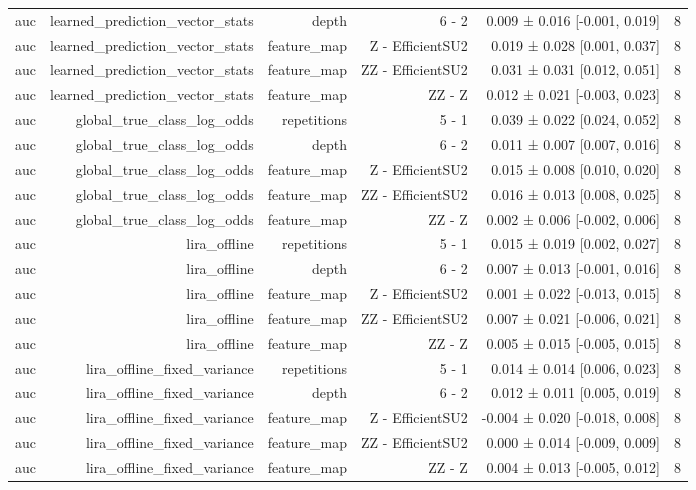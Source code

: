\begin{table}
\begin{tabular}{lrrrrr}
auc & learned\_prediction\_vector\_stats & depth & 6 - 2 & 0.009 ± 0.016 [-0.001, 0.019] & 8 \\
auc & learned\_prediction\_vector\_stats & feature\_map & Z - EfficientSU2 & 0.019 ± 0.028 [0.001, 0.037] & 8 \\
auc & learned\_prediction\_vector\_stats & feature\_map & ZZ - EfficientSU2 & 0.031 ± 0.031 [0.012, 0.051] & 8 \\
auc & learned\_prediction\_vector\_stats & feature\_map & ZZ - Z & 0.012 ± 0.021 [-0.003, 0.023] & 8 \\
auc & global\_true\_class\_log\_odds & repetitions & 5 - 1 & 0.039 ± 0.022 [0.024, 0.052] & 8 \\
auc & global\_true\_class\_log\_odds & depth & 6 - 2 & 0.011 ± 0.007 [0.007, 0.016] & 8 \\
auc & global\_true\_class\_log\_odds & feature\_map & Z - EfficientSU2 & 0.015 ± 0.008 [0.010, 0.020] & 8 \\
auc & global\_true\_class\_log\_odds & feature\_map & ZZ - EfficientSU2 & 0.016 ± 0.013 [0.008, 0.025] & 8 \\
auc & global\_true\_class\_log\_odds & feature\_map & ZZ - Z & 0.002 ± 0.006 [-0.002, 0.006] & 8 \\
auc & lira\_offline & repetitions & 5 - 1 & 0.015 ± 0.019 [0.002, 0.027] & 8 \\
auc & lira\_offline & depth & 6 - 2 & 0.007 ± 0.013 [-0.001, 0.016] & 8 \\
auc & lira\_offline & feature\_map & Z - EfficientSU2 & 0.001 ± 0.022 [-0.013, 0.015] & 8 \\
auc & lira\_offline & feature\_map & ZZ - EfficientSU2 & 0.007 ± 0.021 [-0.006, 0.021] & 8 \\
auc & lira\_offline & feature\_map & ZZ - Z & 0.005 ± 0.015 [-0.005, 0.015] & 8 \\
auc & lira\_offline\_fixed\_variance & repetitions & 5 - 1 & 0.014 ± 0.014 [0.006, 0.023] & 8 \\
auc & lira\_offline\_fixed\_variance & depth & 6 - 2 & 0.012 ± 0.011 [0.005, 0.019] & 8 \\
auc & lira\_offline\_fixed\_variance & feature\_map & Z - EfficientSU2 & -0.004 ± 0.020 [-0.018, 0.008] & 8 \\
auc & lira\_offline\_fixed\_variance & feature\_map & ZZ - EfficientSU2 & 0.000 ± 0.014 [-0.009, 0.009] & 8 \\
auc & lira\_offline\_fixed\_variance & feature\_map & ZZ - Z & 0.004 ± 0.013 [-0.005, 0.012] & 8 \\

\end{tabular}
\end{table}
